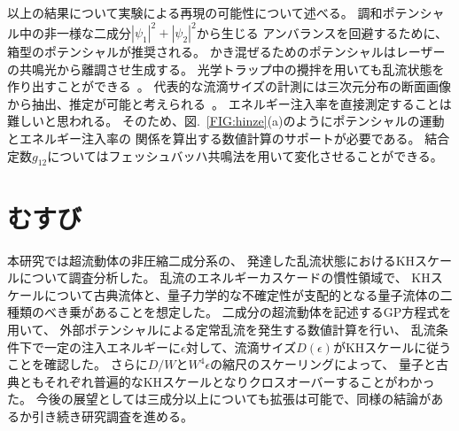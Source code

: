 \documentclass[12pt,a4paper]{jbook}
\begin{document}
        以上の結果について実験による再現の可能性について述べる。
        調和ポテンシャル中の非一様な二成分$|\psi_1|^2+|\psi_2|^2$から生じる
        アンバランスを回避するために、箱型のポテンシャルが推奨される。
        かき混ぜるためのポテンシャルはレーザーの共鳴光から離調させ生成する。
        光学トラップ中の攪拌を用いても乱流状態を作り出すことができる~\cite{Navon}。
        代表的な流滴サイズの計測には三次元分布の断面画像から抽出、推定が可能と考えられる~\cite{Andrews}。
        エネルギー注入率を直接測定することは難しいと思われる。
        そのため、図.~\ref{FIG:hinze}(a)のようにポテンシャルの運動とエネルギー注入率の
        関係を算出する数値計算のサポートが必要である。
        結合定数$g_{12}$についてはフェッシュバッハ共鳴法を用いて変化させることができる。
        




		\section{むすび}
		本研究では超流動体の非圧縮二成分系の、
        発達した乱流状態におけるKHスケールについて調査分析した。
		乱流のエネルギーカスケードの慣性領域で、
		KHスケールについて古典流体と、量子力学的な不確定性が支配的となる量子流体の二種類のべき乗があることを想定した。
        二成分の超流動体を記述するGP方程式を用いて、
        外部ポテンシャルによる定常乱流を発生する数値計算を行い、
		乱流条件下で一定の注入エネルギーに$\epsilon$対して、流滴サイズ$D(\epsilon)$がKHスケールに従うことを確認した。
        さらに$D / W$と$W^4 \epsilon$の縮尺のスケーリングによって、
        量子と古典ともそれぞれ普遍的なKHスケールとなりクロスオーバーすることがわかった。
        今後の展望としては三成分以上についても拡張は可能で、同様の結論があるか引き続き研究調査を進める。
\end{document}
